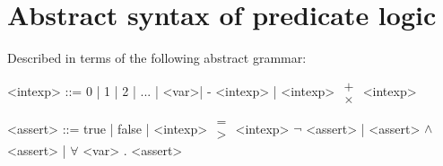 \section{Abstract syntax of predicate logic}

\begin{enumcirc}
	\item
	Described in terms of the following abstract grammar:
	\begin{center}
		\begin{minipage}{0.8\textwidth}
			\begin{grammar}
				<intexp> ::= 0 | 1 | 2 | ...
				| <var>\footnotemark | - <intexp> | <intexp> $\substack{+ \\ \times }$ <intexp>

				<assert> ::= true | false | <intexp> $\substack{= \\ > }$ <intexp>
				\alt $\neg$ <assert> | <assert> $\wedge$ <assert> | $\forall$ <var> . <assert>


\end{grammar}
\end{minipage}
\end{center}
\end{enumcirc}

